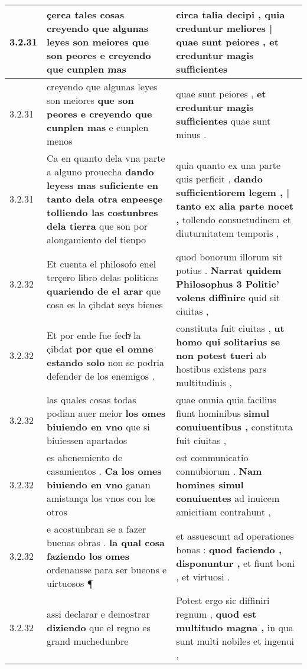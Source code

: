 \begin{tabular}{|p{1cm}|p{6.5cm}|p{6.5cm}|}
3.2.31 & çerca tales cosas \textbf{ creyendo que algunas leyes son meiores } que son peores e creyendo que cunplen mas & circa talia decipi , \textbf{ quia creduntur meliores | quae sunt peiores , } et creduntur magis sufficientes \\\hline
3.2.31 & creyendo que algunas leyes son meiores \textbf{ que son peores e creyendo que cunplen mas } e cunplen menos & quae sunt peiores , \textbf{ et creduntur magis sufficientes } quae sunt minus . \\\hline
3.2.31 & Ca en quanto dela vna parte a alguno prouecha \textbf{ dando leyess mas suficiente en tanto dela otra enpeesçe tolliendo las costunbres dela tierra } que son por alongamiento del tienpo & quia quanto ex una parte quis perficit , \textbf{ dando sufficientiorem legem , | tanto ex alia parte nocet , } tollendo consuetudinem et diuturnitatem temporis , \\\hline
3.2.32 & Et cuenta el philosofo enel terçero libro delas politicas \textbf{ quariendo de el arar } que cosa es la çibdat seys bienes & quod bonorum illorum sit potius . \textbf{ Narrat quidem Philosophus 3 Politic’ volens diffinire } quid sit ciuitas , \\\hline
3.2.32 & Et por ende fue fechͣ la çibdat \textbf{ por que el omne estando solo } non se podria defender de los enemigos . & constituta fuit ciuitas , \textbf{ ut homo qui solitarius se non potest tueri } ab hostibus existens pars multitudinis , \\\hline
3.2.32 & las quales cosas todas podian auer meior \textbf{ los omes biuiendo en vno } que si biuiessen apartados & quae omnia quia facilius fiunt hominibus \textbf{ simul conuiuentibus , } constituta fuit ciuitas , \\\hline
3.2.32 & es abenemiento de casamientos . \textbf{ Ca los omes biuiendo en vno } ganan amistança los vnos con los otros & est communicatio connubiorum . \textbf{ Nam homines simul conuiuentes } ad inuicem amicitiam contrahunt , \\\hline
3.2.32 & e acostunbran se a fazer buenas obras . \textbf{ la qual cosa faziendo los omes } ordenansse para ser bueons e uirtuosos ¶ & et assuescunt ad operationes bonas : \textbf{ quod faciendo , disponuntur , } et fiunt boni , et virtuosi . \\\hline
3.2.32 & assi declarar e demostrar \textbf{ diziendo } que el regno es grand muchedunbre & Potest ergo sic diffiniri regnum , \textbf{ quod est multitudo magna , } in qua sunt multi nobiles et ingenui , \\\hline

\end{tabular}
